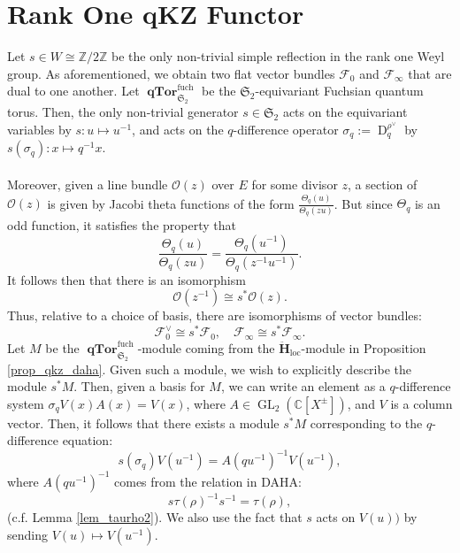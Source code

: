 \documentclass[a4paper]{report}
\theoremstyle{theorem}
\theoremstyle{definition}
\theoremstyle{remark}
\theoremstyle{proposition}
\theoremstyle{conjecture}
\theoremstyle{lemma}
\theoremstyle{corollary}
\theoremstyle{exercise}
\theoremstyle{example}
\newcommand{\C}{\mathbb{C}}
\newcommand{\mcal}{\mathcal}
\newcommand{\on}{\operatorname}
\newcommand{\qTor}{\on{\mathbf{qTor}}}
\begin{document}
  \section{Rank One qKZ Functor}
  
  Let $s \in W \cong \mathbb{Z}/2\mathbb{Z}$ be the only non-trivial simple 
  reflection in the rank one Weyl group. As aforementioned, we obtain 
  two flat vector bundles $\mcal{F}_0$ and $\mcal{F}_\infty$ that are
  dual to one another. 
  Let $\qTor_{\mathfrak{S}_2}^{\on{fuch}}$ be the $\mathfrak{S}_2$-equivariant
  Fuchsian quantum torus. Then, the only non-trivial generator 
  $s\in \mathfrak{S}_2$ acts on the equivariant variables by 
  $s : u \mapsto u^{-1}$, and acts on the $q$-difference operator 
  $\sigma_q := \on{D}_q^{\rho^\vee}$ by $s(\sigma_q) : x \mapsto q^{-1}x$.\\\\
  Moreover, given a line bundle $\mcal{O}(z)$ over $E$
  for some divisor $z$, a section of $\mcal{O}(z)$ is given by Jacobi theta
  functions of the form $\frac{\Theta_q(u)}{\Theta_q(zu)}$. But since $\Theta_q$
  is an odd function, it satisfies the property that 
  \begin{equation}\label{eqn_self_dual}
      \frac{\Theta_q(u)}{\Theta_q(zu)} = \frac{\Theta_q(u^{-1})}{\Theta_q(z^{-1}u^{-1})}.
  \end{equation}
  It follows then that there is an isomorphism 
  $$\mcal{O}(z^{-1}) \cong s^\ast\mcal{O}(z).$$
  Thus, relative to a choice of basis, there are isomorphisms of vector bundles:
  $$\mcal{F}_0^\vee \cong s^\ast\mcal{F}_0,\quad \mcal{F}_\infty \cong s^\ast\mcal{F}_\infty.$$
  Let $M$ be the $\qTor_{\mathfrak{S}_2}^{\on{fuch}}$-module coming from 
  the $\mathbf{\ddot{\mathbf{H}}}_{\on{loc}}$-module in Proposition \ref{prop_qkz_daha}.
  Given such a module, we wish to explicitly describe the module $s^\ast M$.
  Then, given a basis for $M$, we can write an element as a $q$-difference
  system $\sigma_qV(x)A(x) = V(x)$, where $A \in \on{GL}_2(\C[X^\pm])$, and 
  $V$ is a column vector. Then, it follows that there exists a module
  $s^\ast M$ corresponding to the $q$-difference equation:
  \begin{equation}\label{eqn_dual_system}
      s(\sigma_q) V(u^{-1}) = A(qu^{-1})^{-1} V(u^{-1}),
  \end{equation}
  where $A(qu^{-1})^{-1}$ comes from the relation in DAHA: 
  $$s\tau(\rho)^{-1} s^{-1} = \tau(\rho),$$
  (c.f. Lemma \ref{lem_taurho2}).
  We also use the fact that $s$ acts on $V(u))$ by sending $V(u) \mapsto V(u^{-1})$.
\end{document}
